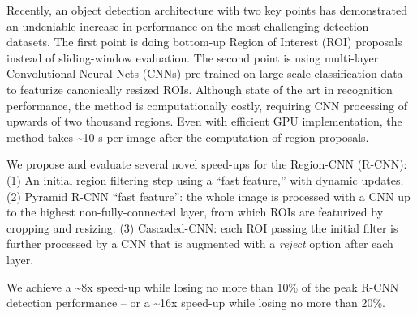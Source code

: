 Recently, an object detection architecture with two key points has demonstrated an undeniable increase in performance on the most challenging detection datasets.
The first point is doing bottom-up Region of Interest (ROI) proposals instead of sliding-window evaluation.
The second point is using multi-layer Convolutional Neural Nets (CNNs) pre-trained on large-scale classification data to featurize canonically resized ROIs.
Although state of the art in recognition performance, the method is computationally costly, requiring CNN processing of upwards of two thousand regions.
Even with efficient GPU implementation, the method takes \textasciitilde{}10 s per image after the computation of region proposals.%

We propose and evaluate several novel speed-ups for the Region-CNN (R-CNN):
(1) An initial region filtering step using a ``fast feature,'' with dynamic updates.
(2) Pyramid R-CNN ``fast feature'': the whole image is processed with a CNN up to the highest
non-fully-connected layer, from which ROIs are featurized by cropping and resizing.
(3) Cascaded-CNN: each ROI passing the initial filter is further processed by a CNN that is augmented with a \emph{reject} option after each layer.

We achieve a \textasciitilde{}8x speed-up while losing no more than 10\% of the peak R-CNN detection performance -- or a \textasciitilde{}16x speed-up while losing no more than 20\%.
